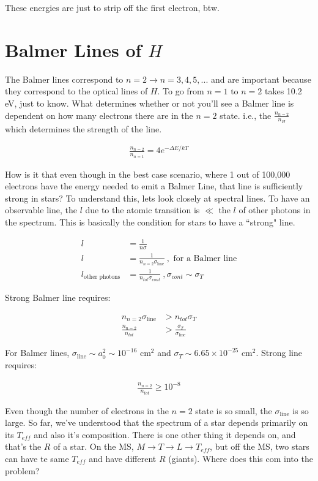 \documentclass[10pt,letterpaper,final]{book}
\newcommand{\ra}{\rightarrow}
\begin{document}
These energies are just to strip off the first electron, btw. 

\section{Balmer Lines of $H$}

The Balmer lines correspond to $n=2 \ra n=3,4,5,...$ and are important because they correspond to the optical lines of $H$. To go from $n=1$ to $n=2$ takes 10.2 eV, just to know. What determines whether or not you'll see a Balmer line is dependent on how many electrons there are in the $n=2$ state. i.e., the $\frac{n_{n=2}}{n_H}$ which determines the strength of the line. 

\begin{align}
\frac{n_{n=2}}{n_{n=1}} = 4e^{-\Delta E /kT}
\end{align}

How is it that even though in the best case scenario, where 1 out of 100,000 electrons have the energy needed to emit a Balmer Line, that line is sufficiently strong in stars? To understand this, lets look closely at spectral lines. To have an observable line, the $l$ due to the atomic transition is $\ll$ the $l$ of other photons in the spectrum. This is basically the condition for stars to have a ``strong" line. 

\begin{align}
l &= \frac{1}{n \sigma}\\
l &= \frac{1}{n_{n=2} \sigma_{\text{line}}}~,\text{ for a Balmer line}\\
l_{\text{other photons}} &= \frac{1}{n_{tot} \sigma_{cont}}~,\sigma_{cont} \sim \sigma_T
\end{align}

Strong Balmer line requires:

\begin{align}
n_{n=2}\sigma_{\text{line}} &> n_{tot}\sigma_T\\
\frac{n_{n=2}}{n_{tot}} &> \frac{\sigma_T}{\sigma_{\text{line}}}
\end{align}

For Balmer lines, $\sigma_{\text{line}} \sim a_0^2 \sim 10^{-16}$ cm$^2$ and $\sigma_T \sim 6.65 \times 10^{-25}$ cm$^2$. Strong line requires:

\begin{align}
\frac{n_{n=2}}{n_{tot}} \geq 10^{-8}
\end{align}

Even though the number of electrons in the $n=2$ state is so small, the $\sigma_{\text{line}} $ is so large. So far, we've understood that the spectrum of a star depends primarily on its $T_{eff}$ and also it's composition. There is one other thing it depends on, and that's the $R$ of a star. On the MS, $M \ra T \ra L \ra T_{eff}$, but off the MS, two stars can have te same $T_{eff}$ and have different $R$ (giants). Where does this com into the problem?
\end{document}
